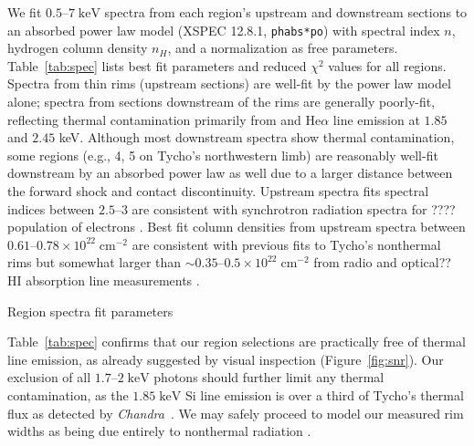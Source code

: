 \documentclass[iop, apj, numberedappendix, twocolappendix]{emulateapj}
\newcommand*{\mt}{\mathrm}
\newcommand*{\unit}[1]{\;\mt{#1}}  %
\newcommand*{\abt}{\mathord{\sim}} %
\newcommand*{\Chandra}{\textit{Chandra}\ }
\begin{document}
We fit $0.5$--$7 \unit{keV}$ spectra from each region's upstream and downstream
sections to an absorbed power law model (XSPEC 12.8.1, \texttt{phabs*po}) with
spectral index $n$, hydrogen column density $n_H$, and a normalization as free
parameters.  Table~\ref{tab:spec} lists best fit parameters and reduced
$\chi^2$ values for all regions.  Spectra from thin rims (upstream sections)
are well-fit by the power law model alone; spectra from sections downstream of
the rims are generally poorly-fit, reflecting thermal contamination primarily
from  and  He$\alpha$ line emission at $1.85$ and $2.45$
keV.  Although most downstream spectra show thermal contamination, some regions
(e.g., 4, 5 on Tycho's northwestern limb) are reasonably well-fit downstream by
an absorbed power law as well due to a larger distance between the forward
shock and contact discontinuity.
Upstream spectra fits spectral indices between $2.5$--$3$ are consistent with
synchrotron radiation spectra for ???? population of electrons
. Best fit column densities from
upstream spectra between $0.61$--$0.78 \times 10^{22} \unit{cm^{-2}}$ are
consistent with previous fits to Tycho's nonthermal rims \citep{hwang2002} but
somewhat larger than $\abt0.35$--$0.5 \times 10^{22} \unit{cm^{-2}}$ from radio
and optical??  HI absorption line measurements \citep{black1984, albinson1986,
kothes2004}.


\begin{table}
    \scriptsize
    \centering
    \caption{Region spectra fit parameters\label{tab:spec}}
    
\end{table}

Table~\ref{tab:spec} confirms that our region selections are practically free
of thermal line emission, as already suggested by visual inspection
(Figure~\ref{fig:snr}).  Our exclusion of all $1.7$--$2
\unit{keV}$ photons should further limit any thermal contamination, as
the $1.85 \unit{keV}$ Si line emission is over a third of Tycho's thermal flux
as detected by \Chandra \citep{hwang2002}.  We may safely proceed to model our
measured rim widths as being due entirely to nonthermal radiation
.
\end{document}
